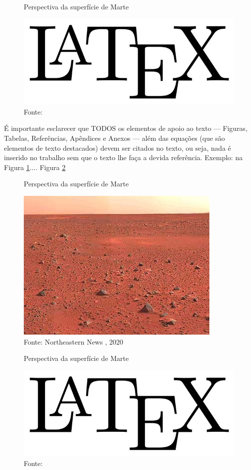 \begin{figure}[h]
    \centering
    \caption{Perspectiva da superfície de Marte}
    \centering
    \includegraphics[width=.40\linewidth]{images/latex_00.jpg}
    \caption*{Fonte: \cite{lu2017industry} }
    \label{fig:my_label}
\end{figure}

É importante esclarecer que TODOS os elementos de apoio ao texto — Figuras, Tabelas, Referências, Apêndices e Anexos — além das equações (que são elementos de texto destacados) devem ser citados no texto, ou seja, nada é inserido no trabalho sem que o texto lhe faça a devida referência. Exemplo: na Figura \ref{fig:my_label}.... Figura \ref{fig:my_label2}

\begin{figure}[h]
    \centering
    \caption{Perspectiva da superfície de Marte}
    \centering
    \includegraphics[width=.65\linewidth]{images/marte.jpg}
    \caption*{Fonte: Northeastern News \footnotemark , 2020}
    \label{fig:my_label2}
\end{figure}

\begin{figure}[h]
    \centering
    \caption{Perspectiva da superfície de Marte}
    \centering
    \includegraphics[width=.40\linewidth]{images/latex_00.jpg}
    \caption*{Fonte: \cite{lu2017industry} }
    \label{fig:my_label4}
\end{figure}

